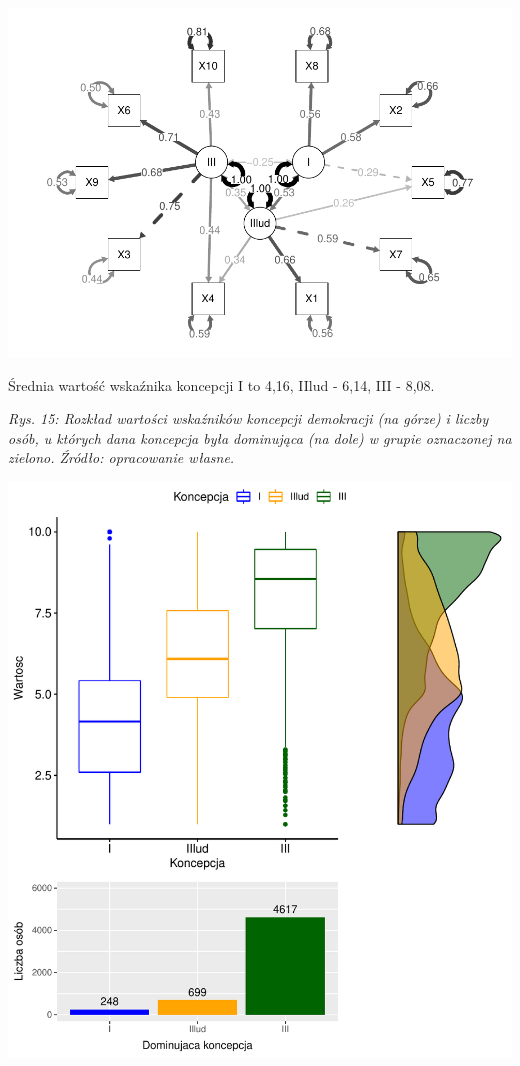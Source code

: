 \documentclass[12pt]{article}
\begin{document}
\begin{center}\includegraphics{text_ASA_files/figure-latex/diagram-1-1} \end{center}

Średnia wartość wskaźnika koncepcji I to 4,16, IIlud - 6,14, III - 8,08.

\emph{Rys. 15: Rozkład wartości wskaźników koncepcji demokracji (na górze) i liczby osób, u których dana koncepcja była dominująca (na dole) w grupie oznaczonej na zielono. Źródło: opracowanie własne.}

\begin{center}\includegraphics{text_ASA_files/figure-latex/stats-gr-1-1} \end{center}
\end{document}
